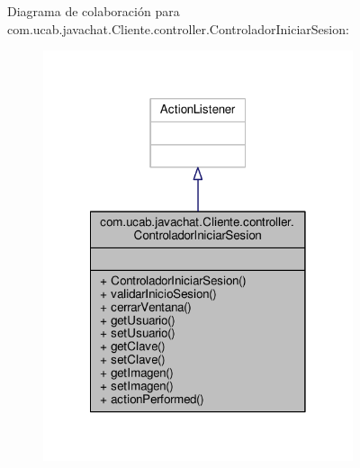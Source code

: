 Diagrama de colaboración para com.\-ucab.\-javachat.\-Cliente.\-controller.\-Controlador\-Iniciar\-Sesion\-:
\nopagebreak
\begin{figure}[H]
\begin{center}
\leavevmode
\includegraphics[width=258pt]{db/d9c/classcom_1_1ucab_1_1javachat_1_1_cliente_1_1controller_1_1_controlador_iniciar_sesion__coll__graph}
\end{center}
\end{figure}
